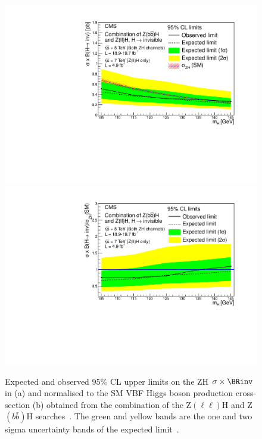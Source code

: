 \begin{figure}
  \includegraphics[width=.65\largefigwidth]{plots/prompt/HIG-13-30-figs/zhxslimit.pdf}
  \includegraphics[width=.65\largefigwidth]{plots/prompt/HIG-13-30-figs/zhlimit.pdf}
  \caption{Expected and observed 95\% \ac{CL} upper limits on the \ac{ZH} $\sigma\times\BRinv$ in \pb (a) and normalised to the SM \ac{VBF} Higgs boson production cross-section (b) obtained from the combination of the Z$(\ell\ell)$H and Z$(b\bar{b})$H searches~\cite{Chatrchyan:2014tja}. The green and yellow bands are the one and two sigma uncertainty bands of the expected limit~\cite{Chatrchyan:2014tja}.}
  \label{fig:zhcomb}
\end{figure}


